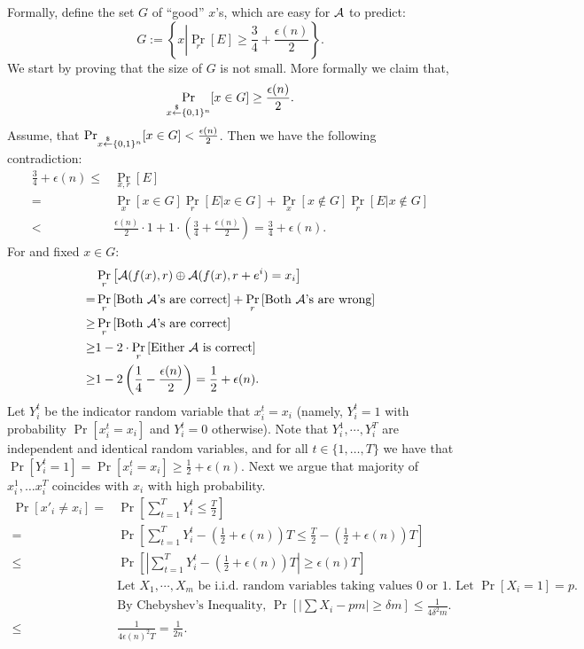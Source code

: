 \noindent Formally, define the set $G$ of ``good'' $x$'s, which are easy for ${\mathcal A}$  to predict:
$$G := \left\{x \left| \Pr_r \left[ E \right]\geq \frac{3}{4} + \frac{\epsilon(n)}{2} \right. \right\}.$$
We start by proving that the size of $G$ is not small. More formally we claim that,
$$\Pr_{x \stackrel{\$}{\leftarrow} \{ 0, 1 \}^{n}}[x \in G] \geq \frac{\epsilon(n)}{2}.$$
Assume, that $\Pr_{x \stackrel{\$}{\leftarrow} \{ 0, 1 \}^{n}}[x \in G] < \frac{\epsilon(n)}{2}$. Then we have the following contradiction:
\begin{align*}
\frac{3}{4} + \epsilon(n) \leq& \Pr_{x,r}[E]\\
=& \Pr_x [x \in G] \Pr_{r}[E| x\in G] + \Pr_x [x \notin G] \Pr_{r}[E | x\notin G]\\
< & \frac{\epsilon(n)}{2} \cdot 1 + 1\cdot \left(\frac{3}{4}+\frac{\epsilon(n)}{2}\right)  = \frac{3}{4} + \epsilon(n).
\end{align*}
For and fixed $x \in G$:
\begin{align*}
&\Pr_{r} \left[ {\mathcal A}(f(x), r) \oplus {\mathcal A}(f(x), r+e^i) = x_i \right]\\
=& \Pr_{r} \left[ \text{Both ${\mathcal A}$'s are correct} \right] + \Pr_{r} \left[ \text{Both ${\mathcal A}$'s are wrong} \right]\\
\geq& \Pr_{r} \left[ \text{Both ${\mathcal A}$'s are correct} \right]\\
\geq& 1-2 \cdot \Pr_{r} \left[ \text{Either ${\mathcal A}$ is correct} \right]\\
\geq& 1-2\left(\frac{1}{4} - \frac{\epsilon(n)}{2} \right)
= \frac{1}{2} + \epsilon(n).
\end{align*}
Let $Y_i^t$ be the indicator random variable that $x_i^t = x_i$ (namely, $Y_i^t=1$ with probability  $\Pr[x_i^t = x_i]$ and $Y_i^t=0$ otherwise).
Note that $Y_i^1, \cdots, Y_i^T$ are independent and identical random variables, and for all $t \in \{1,\ldots, T\}$ we have that $\Pr[Y_i^t=1] = \Pr[x_i^t = x_i] \geq \frac{1}{2} + \epsilon(n)$. Next we argue that majority of $x_i^1, \ldots x_i^T$ coincides with $x_i$ with high probability.
\begin{align*}
\Pr[x'_i \neq x_i]
=& \Pr\left[\sum_{t=1}^T Y_i^t \leq \frac{T}{2} \right]\\
=& \Pr\left[\sum_{t=1}^T  Y_i^t- \left(\frac{1}{2} + \epsilon(n) \right)T \leq \frac{T}{2} - \left(\frac{1}{2} + \epsilon(n) \right)T \right]\\
\leq& \Pr\left[ \left| \sum_{t=1}^T  Y_i^t- \left(\frac{1}{2} + \epsilon(n) \right)T \right| \geq \epsilon(n)T \right]\\
& \text{Let $X_1,\cdots,X_m$ be i.i.d. random variables taking values 0 or 1. Let $\Pr[X_i=1] = p$.}\\
& \text{By Chebyshev's Inequality, $\Pr\left[ \left| \sum X_i - pm \right| \geq \delta m \right] \leq \frac{1}{4\delta^2 m}$.}\\
\leq& \frac{1}{4\epsilon(n)^2T} = \frac{1}{2n}.
\end{align*}
